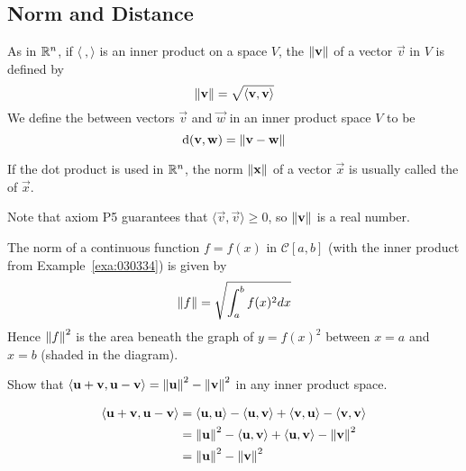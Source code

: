 \documentclass{ximera}
\begin{document}
\subsection*{Norm and Distance}

\begin{definition}\label{def:030438}
As in $\mathbb{R}^n$, if $\langle\ , \rangle$ is an inner product on a space $V$, the 
 $\left\lVert\mathbf{v}\right\rVert$ of a vector $\vec{v}$ in $V$ is defined by
\begin{equation*}
\left\lVert \mathbf{v} \right\rVert = \sqrt{\langle \mathbf{v}, \mathbf{v} \rangle}
\end{equation*}
We define the  between vectors $\vec{v}$ and $\vec{w}$ in an inner product space $V$ to be
\begin{equation*}
\mbox{d}(\mathbf{v}, \mathbf{w}) = \left\lVert \mathbf{v} - \mathbf{w} \right\rVert
\end{equation*}
\end{definition}
\begin{remark}
 If the dot product is used in $\mathbb{R}^n$, the norm $\left\lVert\mathbf{x}\right\rVert$ of a vector $\vec{x}$ is usually called the  of $\vec{x}$.   
\end{remark}


Note that axiom P5 guarantees that
$\langle\vec{v}, \vec{v}\rangle \geq 0$, so $\left\lVert\mathbf{v}\right\rVert$ is a real number.

\begin{example}\label{exa:030446}

The norm of a continuous function $f = f(x)$ in $\mathcal{C}[a, b]$ (with the inner product from Example~\ref{exa:030334}) is given by
\begin{equation*}
\left\lVert f \right\rVert = \sqrt{\int_{a}^{b} f(x)^2dx}
\end{equation*}
Hence $\left\lVert f\right\rVert^{2}$ is the area beneath the graph of $y = f(x)^{2}$ between $x = a$ and $x = b$ (shaded in the diagram).
\end{example}

\begin{example}\label{030454}
Show that $\langle\mathbf{u} + \mathbf{v}, \mathbf{u} - \mathbf{v}\rangle = \left\lVert\mathbf{u}\right\rVert^{2} - \left\lVert\mathbf{v}\right\rVert^{2}$ in any inner product space.

\begin{explanation}
\begin{align*}
\langle \mathbf{u} + \mathbf{v}, \mathbf{u} - \mathbf{v} \rangle &= \langle \mathbf{u}, \mathbf{u} \rangle - \langle \mathbf{u}, \mathbf{v} \rangle + \langle \mathbf{v}, \mathbf{u} \rangle - \langle \mathbf{v}, \mathbf{v} \rangle \\
&= \left\lVert \mathbf{u} \right\rVert^2 - \langle \mathbf{u}, \mathbf{v} \rangle + \langle \mathbf{u}, \mathbf{v} \rangle - \left\lVert \mathbf{v} \right\rVert^2 \\
&= \left\lVert \mathbf{u} \right\rVert^2 - \left\lVert \mathbf{v} \right\rVert^2
\end{align*}
\end{explanation}
\end{example}
\end{document}

